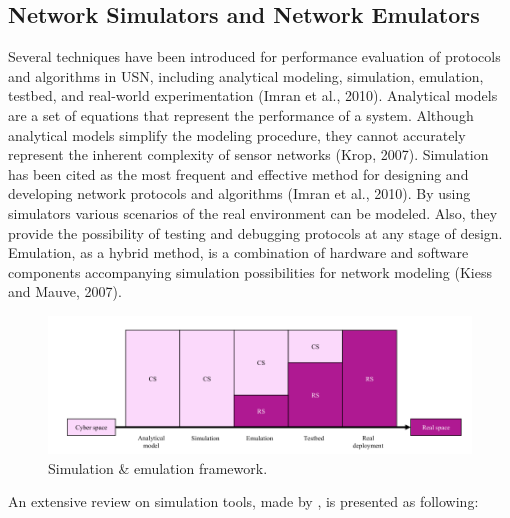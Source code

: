 \subsection{Network Simulators and Network Emulators}

Several techniques have been introduced for performance evaluation of protocols and algorithms in USN, including analytical modeling,
simulation, emulation, testbed, and real-world experimentation (Imran
et al., 2010). Analytical models are a set of equations that represent the
performance of a system. Although analytical models simplify the
modeling procedure, they cannot accurately represent the inherent
complexity of sensor networks (Krop, 2007). Simulation has been cited
as the most frequent and effective method for designing and developing
network protocols and algorithms (Imran et al., 2010). By using
simulators various scenarios of the real environment can be modeled.
Also, they provide the possibility of testing and debugging protocols at
any stage of design. Emulation, as a hybrid method, is a combination of
hardware and software components accompanying simulation possibilities for network modeling (Kiess and Mauve, 2007). 

\begin{figure}[h!]
	\centering
	\includegraphics[width=1\textwidth,keepaspectratio]{figures/simul_VS_emul}
	\caption{Simulation \& emulation framework.}
	
\end{figure}

An extensive review on simulation tools, made by \cite{nayyar2015}, is presented as following:

